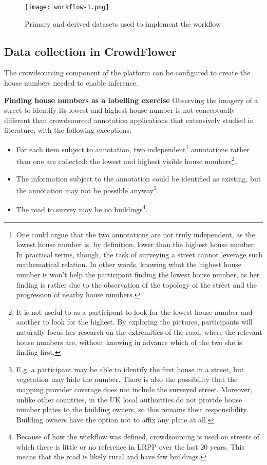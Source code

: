 \begin{figure}
	\texttt{[image: workflow-1.png]}
	\caption{Primary and derived datasets used to implement the workflow}
	\label{fig:workflow_1}
\end{figure}

\subsection{Data collection in CrowdFlower}

The crowdsourcing component of the platform can be configured to create the house numbers needed to enable inference. 

\textbf{Finding house numbers as a labelling exercise} Observing the imagery of a street to identify its lowest and highest house number is not conceptually different than crowdsourced annotation applications that extensively studied in literature, with the following exceptions:

\begin{itemize}
        
    \item For each item subject to annotation, two independent\footnote{One could argue that the two annotations are not truly independent, as the lowest house number is, by definition, lower than the highest house number. In practical terms, though, the task of surveying a street cannot leverage such mathematical relation. In other words, knowing what the highest house number is won't help the participant finding the lowest house number, as her finding is rather due to the observation of the topology of the street and the progression of nearby house numbers.} annotations rather than one are collected: the lowest and highest visible house numbers\footnote{It is not useful to as a participant to look for the lowest house number and another to look for the highest. By exploring the pictures, participants will naturally focus her research on the extremities of the road, where the relevant house numbers are, without knowing in advance which of the two she is finding first.}.
        
    \item The information subject to the annotation could be identified as existing, but the annotation may not be possible anyway\footnote{E.g. a participant may be able to identify the first house in a street, but vegetation may hide the number. There is also the possibility that the mapping provider coverage does not include the surveyed street. Moreover, unlike other countries, in the UK local authorities do not provide house number plates to the building owners, so this remains their responsibility. Building owners have the option not to affix any plate at all.}.
        
    \item The road to survey may be no buildings\footnote{Because of how the workflow was defined, crowdsourcing is used on streets of which there is little or no reference in LRPP over the last 20 years. This means that the road is likely rural and have few buildings.}.
        
\end{itemize}

